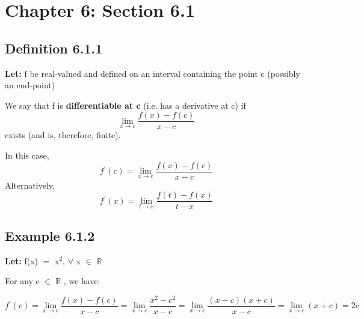 \documentclass{article}
\newcommand{\mt}[1]{\ensuremath{#1}}
\newcommand\bsc[2][\DefaultOpt]{%
  \def\DefaultOpt{#2}%
  \section[#1]{#2}%
}
\newcommand\ssc[2][\DefaultOpt]{%
  \def\DefaultOpt{#2}%
  \subsection[#1]{#2}%
}
\newcommand{\lt}[1]{\textbf{Let: } #1}
\newcommand{\br}{\mt{\mathbb{R}} }       %
\newcommand{\fa}{\mt{\forall} }          %
\newcommand{\mem}{\mt{\in} }
\newcommand{\ps}{\mt{+} }
\newcommand{\eql}{\mt{=} }
\newcommand{\pr}{\mt{^\prime} } 		   %
\newcommand{\uf}[2]{#1\mt{^{#2}}}
\newcommand{\limt}[2]{\mt{\displaystyle{\lim_{#1 \to #2}}}}
\newcommand{\eqn}[1]{\[#1\]}
\begin{document}
\bsc{Chapter 6: Section 6.1}{

\ssc{Definition 6.1.1}{

\lt{f be real-valued and defined on an interval containing the point c (possibly an end-point)}

We say that f is \textbf{differentiable at c} (i.e. has a derivative at c) if
\eqn{\limt{x}{c} \frac{f(x) - f(c)}{x - c}}
exists (and is, therefore, finite).


In this case,
\eqn{f\pr(c) = \limt{x}{c} \frac{f(x) - f(c)}{x - c}}
Alternatively,
\eqn{f\pr(x) = \limt{t}{x} \frac{f(t) - f(x)}{t - x}}

}

\ssc{Example 6.1.2}{

\lt{f(x) \eql \uf{x}{2}, \fa x \mem \br}

For any c \mem \br, we have:

\eqn{f\pr(c) = \limt{x}{c} \frac{f(x) - f(c)}{x - c} = \limt{x}{c} \frac{x^2 - c^2}{x - c} = \limt{x}{c} \frac{(x - c)(x + c)}{x - c} = \limt{x}{c} (x \ps c) = 2c}

}

}
\end{document}

